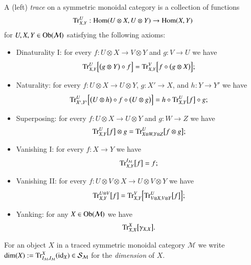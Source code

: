 \documentclass{amsart}
\def\tn{\textnormal}
\def\mc{\mathcal}
\def\Hom{\tn{Hom}}
\def\Ob{\tn{Ob}}
\def\dim{\tn{dim}}
\def\Trace{\tn{Tr}}
\def\to{\rightarrow}
\def\id{\tn{id}}
\def\mcM{\mc{M}}
\def\mcS{\mc{S}}
\theoremstyle{remark}
\theoremstyle{definition}
\begin{document}
A (left) \emph{trace} on a symmetric monoidal category is a collection of functions 
\[\Trace^U_{X,Y}:\Hom(U\otimes X,U\otimes Y)\to\Hom(X,Y)\]
for $U,X,Y\in\Ob(\mcM)$ satisfying the following axioms:
\begin{itemize}
 \item Dinaturality I: for every $f:U\otimes X\to V\otimes Y$ and $g:V\to U$ we have
 \[\Trace^U_{X,Y}\Big[\big(g\otimes Y\big)\circ f\Big]=\Trace^V_{X,Y}\Big[f\circ\big(g\otimes X\big)\Big];\] 
 \item Naturality: for every $f:U\otimes X\to U\otimes Y$, $g:X'\to X$, and $h:Y\to Y'$ we have
 \[\Trace^U_{X',Y'}\Big[\big(U\otimes h\big)\circ f\circ\big(U\otimes g\big)\Big]=h\circ\Trace^U_{X,Y}\big[f\big]\circ g;\]
 \item Superposing: for every $f:U\otimes X\to U\otimes Y$ and $g:W\to Z$ we have
 \[\Trace^U_{X,Y}\big[f\big]\otimes g=\Trace^U_{X\otimes W,Y\otimes Z}\big[f\otimes g\big];\]
 \item Vanishing I: for every $f:X\to Y$ we have
 \[\Trace^{I_\mcM}_{X,Y}\big[f\big]=f;\]
 \item Vanishing II: for every $f:U\otimes V\otimes X\to U\otimes V\otimes Y$ we have
 \[\Trace^{U\otimes V}_{X,Y}\big[f\big]=\Trace^V_{X,Y}\Big[\Trace^U_{V\otimes X,V\otimes Y}\big[f\big]\Big];\]
 \item Yanking: for any $X\in\Ob(\mcM)$ we have
 \[\Trace^X_{X,X}\big[\gamma_{X,X}\big].\]
\end{itemize}

For an object $X$ in a traced symmetric monoidal category $\mcM$ we write $\dim(X):=\Trace^X_{I_\mcM,I_\mcM}(\id_X)\in\mcS_\mcM$ for the {\em dimension} of $X$.
\end{document}
